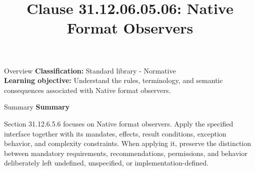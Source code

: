 \documentclass[10pt,letterpaper]{article}
\title{Clause 31.12.06.05.06: Native Format Observers}
\author{}
\date{}
\begin{document}
\maketitle
\begin{CornellOverviewBox}{Overview}
\textbf{Classification:} Standard library - Normative\\[2pt]
\textbf{Learning objective:} Understand the rules, terminology, and semantic consequences associated with Native format observers.
\end{CornellOverviewBox}\begin{CornellSummaryBox}{Summary}
{\sffamily\bfseries\color{Accent} Summary}\par\vspace{3pt}Section 31.12.6.5.6 focuses on Native format observers. Apply the specified interface together with its mandates, effects, result conditions, exception behavior, and complexity constraints. When applying it, preserve the distinction between mandatory requirements, recommendations, permissions, and behavior deliberately left undefined, unspecified, or implementation-defined.
\end{CornellSummaryBox}
\end{document}
